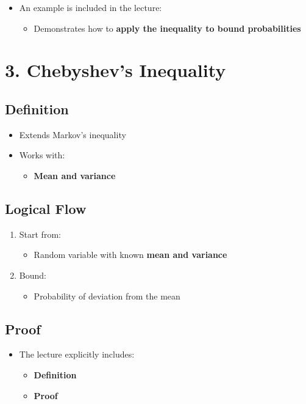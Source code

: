 \documentclass[12pt]{article}
\begin{document}
\begin{itemize}
    \item An example is included in the lecture:
    \begin{itemize}
        \item Demonstrates how to \textbf{apply the inequality to bound probabilities}
    \end{itemize}
\end{itemize}

\section*{3. Chebyshev’s Inequality}

\subsection*{Definition}

\begin{itemize}
    \item Extends Markov’s inequality
    \item Works with:
    \begin{itemize}
        \item \textbf{Mean and variance}
    \end{itemize}
\end{itemize}

\subsection*{Logical Flow}

\begin{enumerate}
    \item Start from:
    \begin{itemize}
        \item Random variable with known \textbf{mean and variance}
    \end{itemize}
    \item Bound:
    \begin{itemize}
        \item Probability of deviation from the mean
    \end{itemize}
\end{enumerate}

\subsection*{Proof}

\begin{itemize}
    \item The lecture explicitly includes:
    \begin{itemize}
        \item \textbf{Definition}
        \item \textbf{Proof}
    \end{itemize}
\end{itemize}
\end{document}
